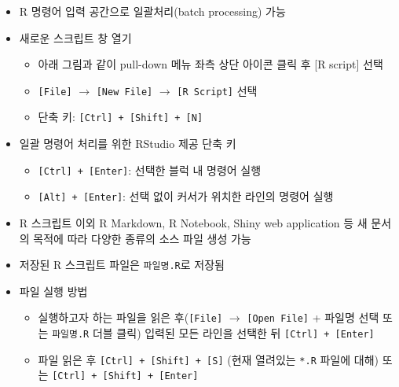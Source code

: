 \documentclass[
  11pt,
]{krantz}
\providecommand{\tightlist}{%
  \setlength{\itemsep}{0pt}\setlength{\parskip}{0pt}}
\begin{document}
\begin{itemize}
\tightlist
\item
  R 명령어 입력 공간으로 일괄처리(batch processing) 가능
\item
  새로운 스크립트 창 열기

  \begin{itemize}
  \tightlist
  \item
    아래 그림과 같이 pull-down 메뉴 좌측 상단 아이콘 클릭 후 {[}R script{]} 선택
  \item
    \texttt{{[}File{]}} \(\rightarrow\) \texttt{{[}New\ File{]}} \(\rightarrow\) \texttt{{[}R\ Script{]}} 선택
  \item
    단축 키: \texttt{{[}Ctrl{]}\ +\ {[}Shift{]}\ +\ {[}N{]}}
  \end{itemize}
\item
  일괄 명령어 처리를 위한 RStudio 제공 단축 키

  \begin{itemize}
  \tightlist
  \item
    \texttt{{[}Ctrl{]}\ +\ {[}Enter{]}}: 선택한 블럭 내 명령어 실행
  \item
    \texttt{{[}Alt{]}\ +\ {[}Enter{]}}: 선택 없이 커서가 위치한 라인의 명령어 실행
  \end{itemize}
\item
  R 스크립트 이외 R Markdown, R Notebook, Shiny web application 등 새 문서의 목적에 따라 다양한 종류의 소스 파일 생성 가능
\item
  저장된 R 스크립트 파일은 \texttt{파일명.R}로 저장됨
\item
  파일 실행 방법

  \begin{itemize}
  \tightlist
  \item
    실행하고자 하는 파일을 읽은 후(\texttt{{[}File{]}} \(\rightarrow\) \texttt{{[}Open\ File{]}} + 파일명 선택 또는 \texttt{파일명.R} 더블 클릭) 입력된 모든 라인을 선택한 뒤 \texttt{{[}Ctrl{]}\ +\ {[}Enter{]}}
  \item
    파일 읽은 후 \texttt{{[}Ctrl{]}\ +\ {[}Shift{]}\ +\ {[}S{]}} (현재 열려있는 \texttt{*.R} 파일에 대해) 또는 \texttt{{[}Ctrl{]}\ +\ {[}Shift{]}\ +\ {[}Enter{]}}
  \end{itemize}
\end{itemize}

\footnotesize
\end{document}
